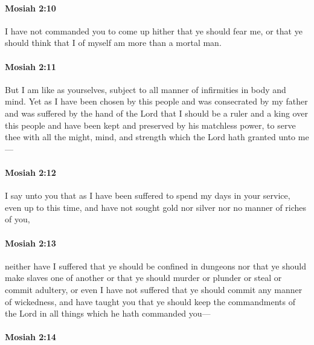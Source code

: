 		\paragraph{Mosiah 2:10} %
			\label{MOSIAH-2-10}
			
			I have not commanded you to come up hither that ye should fear me,
			or that ye should think that I of myself am more than a mortal man.
			
		\paragraph{Mosiah 2:11} %
			\label{MOSIAH-2-11}
			
			But I am like as yourselves,
			subject to all manner of infirmities in body and mind.
			Yet as I have been chosen by this people
			and was consecrated by my father
			and was suffered by the hand of the Lord
			that I should be a ruler and a king over this people
			and have been kept and preserved by his matchless power,
			to serve thee with all the might, mind, and strength
			which the Lord hath granted unto me---
			
		\paragraph{Mosiah 2:12} %
			\label{MOSIAH-2-12}
			
			I say unto you that as I have been suffered
			to spend my days in your service, even up to this time,
			and have not sought gold nor silver
			nor no manner of riches of you,
			
		\paragraph{Mosiah 2:13} %
			\label{MOSIAH-2-13}
			
			neither have I suffered that ye should be confined in dungeons
			nor that ye should make slaves one of another
			or that ye should murder or plunder or steal or commit adultery,
			or even I have not suffered that ye should commit any manner of wickedness,
			and have taught you that ye should keep the commandments of the Lord
			in all things which he hath commanded you---
			
		\paragraph{Mosiah 2:14} %
			\label{MOSIAH-2-14}
			
